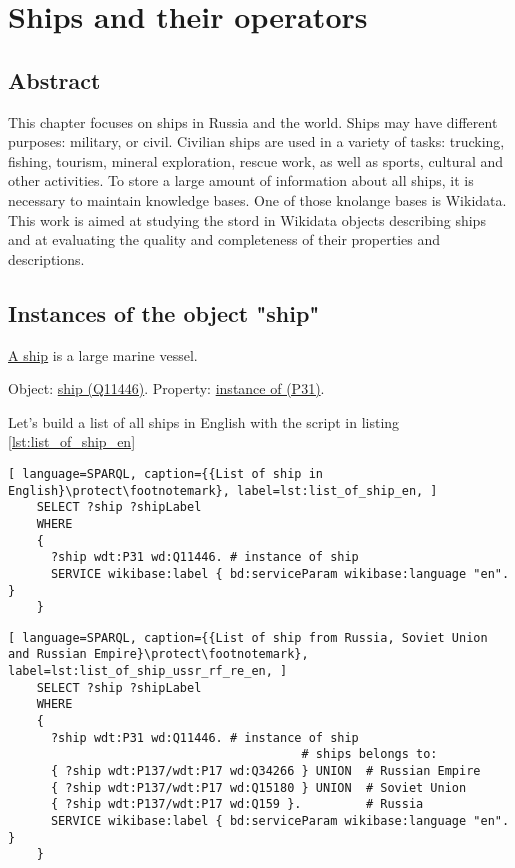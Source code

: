 \setchapterpreamble[u]{\margintoc}

\setchapterpreamble[u]{\margintoc}
\chapter{Ships and their operators}


\section{Abstract}

This chapter focuses on ships in Russia and the world. Ships may have different purposes: military, or civil. Civilian ships are used in a variety of tasks: trucking, fishing, tourism, mineral exploration, rescue work, as well as sports, cultural and other activities. To store a large amount of information about all ships, it is necessary to maintain knowledge bases. One of those knolange bases is Wikidata. This work is aimed at studying the stord in Wikidata objects describing ships and at evaluating the quality and completeness of their properties and descriptions.


\section{Instances of the object "ship"}

\href{https://en.wikipedia.org/wiki/Ship}{A ship} is a large marine vessel.

Object: \href{https://www.wikidata.org/wiki/Q11446}{ship (Q11446)}.
Property: \href{https://www.wikidata.org/wiki/Property:P31}{instance of (P31)}.

Let's build a list of all ships in English with the script in listing \ref{lst:list_of_ship_en}

\begin{lstlisting}[ language=SPARQL, caption={{List of ship in English}\protect\footnotemark}, label=lst:list_of_ship_en, ]
    SELECT ?ship ?shipLabel
    WHERE
    {
      ?ship wdt:P31 wd:Q11446. # instance of ship
      SERVICE wikibase:label { bd:serviceParam wikibase:language "en". }
    }
  \end{lstlisting}

  
\begin{lstlisting}[ language=SPARQL, caption={{List of ship from Russia, Soviet Union and Russian Empire}\protect\footnotemark}, label=lst:list_of_ship_ussr_rf_re_en, ]
    SELECT ?ship ?shipLabel
    WHERE
    {
      ?ship wdt:P31 wd:Q11446. # instance of ship
                                         # ships belongs to:
      { ?ship wdt:P137/wdt:P17 wd:Q34266 } UNION  # Russian Empire
      { ?ship wdt:P137/wdt:P17 wd:Q15180 } UNION  # Soviet Union
      { ?ship wdt:P137/wdt:P17 wd:Q159 }.         # Russia
      SERVICE wikibase:label { bd:serviceParam wikibase:language "en". }
    }
  \end{lstlisting}

